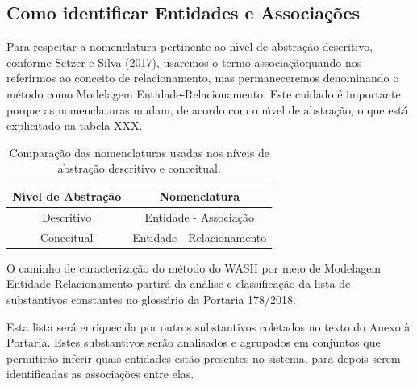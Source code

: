 \documentclass[
12pt,		%
openright,	%
twoside,  %
a4paper,			%
chapter=TITLE,		%
english,			%
french,				%
spanish,			%
brazil				%
]{USPSC-classe/USPSC}
\begin{document}
\subsection[Como identificar Entidades e Associa\c{c}\~oes]{Como identificar Entidades e Associa\c{c}\~oes}\label{Como identificar Entidades e Associa\c{c}\~oes}
Para respeitar a nomenclatura pertinente ao n\'{\i}vel de abstra\c{c}\~ao descritivo, conforme  Setzer e Silva (2017), usaremos o termo \textquotedbl associa\c{c}\~ao\textquotedbl  quando nos referirmos ao conceito de \textquotedbl relacionamento\textquotedbl , mas permaneceremos denominando o m\'etodo como \textquotedbl Modelagem Entidade-Relacionamento\textquotedbl . Este cuidado \'e importante porque as nomenclaturas mudam, de acordo com o n\'{\i}vel de abstra\c{c}\~ao, o que est\'a explicitado na tabela XXX.


















\begin{table}[htb]
\tiny
\caption{\label{7dc6a0cd1483e951a803f257b4a9664fa3a268ad}Compara\c{c}\~ao das nomenclaturas usadas nos n\'{i}veis de abstra\c{c}\~ao descritivo e conceitual.}

\centering
\begin{tabular}{|c|c|}
\hline
N\'{\i}vel de Abstra\c{c}\~ao  &  Nomenclatura \\
\hline
Descritivo  &  Entidade - Associa\c{c}\~ao \\
Conceitual  &  Entidade - Relacionamento \\
\hline
\end{tabular}
\end{table}


O caminho de caracteriza\c{c}\~ao do m\'etodo do WASH por meio de Modelagem Entidade Relacionamento partir\'a da an\'alise e classifica\c{c}\~ao da lista de substantivos constantes no gloss\'ario da Portaria 178/2018.














Esta lista ser\'a enriquecida por outros substantivos coletados no texto do Anexo \`a Portaria. Estes substantivos ser\~ao analisados e agrupados em conjuntos que permitir\~ao inferir quais entidades est\~ao presentes no sistema, para depois serem identificadas as associa\c{c}\~oes entre elas.
\end{document}
